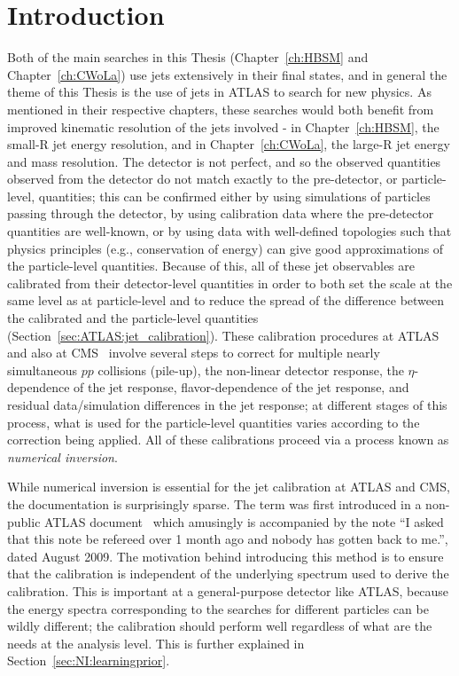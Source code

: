 \section{Introduction}
Both of the main searches in this Thesis (Chapter~\ref{ch:HBSM} and Chapter~\ref{ch:CWoLa}) use jets extensively in their final states, and in general the theme of this Thesis is the use of jets in ATLAS to search for new physics.
As mentioned in their respective chapters, these searches would both benefit from improved kinematic resolution of the jets involved - in Chapter~\ref{ch:HBSM}, the small-R jet energy resolution, and in Chapter~\ref{ch:CWoLa}, the large-R jet energy and mass resolution.
The detector is not perfect, and so the observed quantities observed from the detector do not match exactly to the pre-detector, or particle-level, quantities;
this can be confirmed either by using simulations of particles passing through the detector, by using calibration data where the pre-detector quantities are well-known, or by using data with well-defined topologies such that physics principles (e.g., conservation of energy) can give good approximations of the particle-level quantities.
Because of this, all of these jet observables are calibrated from their detector-level quantities in order to both set the scale at the same level as at particle-level and to reduce the spread of the difference between the calibrated and the particle-level quantities (Section~\ref{sec:ATLAS:jet_calibration}).
These calibration procedures at ATLAS~\cite{Aad:2011he} and also at CMS~\cite{Chatrchyan:2011ds,Khachatryan:2016kdb} involve several steps to correct for multiple nearly simultaneous $pp$ collisions (pile-up), the non-linear detector response, the $\eta$-dependence of the jet response, flavor-dependence of the jet response, and residual data/simulation differences in the jet response;
at different stages of this process, what is used for the particle-level quantities varies according to the correction being applied.
All of these calibrations proceed via a process known as \textit{numerical inversion}.

While numerical inversion is essential for the jet calibration at ATLAS and CMS, the documentation is surprisingly sparse.
The term was first introduced in a non-public ATLAS document~\cite{LopezMateos:1163916} which amusingly is accompanied by the note ``I asked that this note be refereed over 1 month ago and nobody has gotten back to me.'', dated August 2009. 
The motivation behind introducing this method is to ensure that the calibration is independent of the underlying spectrum used to derive the calibration.
This is important at a general-purpose detector like ATLAS, because the energy spectra corresponding to the searches for different particles can be wildly different; the calibration should perform well regardless of what are the needs at the analysis level.
This is further explained in Section~\ref{sec:NI:learningprior}.

